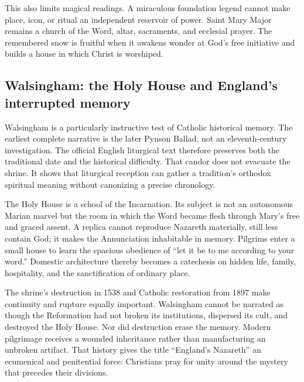 This also limits magical readings. A miraculous foundation legend cannot make place, icon, or ritual an independent reservoir of power. Saint Mary Major remains a church of the Word, altar, sacraments, and ecclesial prayer. The remembered snow is fruitful when it awakens wonder at God's free initiative and builds a house in which Christ is worshiped.

\subsection{Walsingham: the Holy House and England's interrupted memory}


Walsingham is a particularly instructive test of Catholic historical memory. The earliest complete narrative is the later Pynson Ballad, not an eleventh-century investigation. The official English liturgical text therefore preserves both the traditional date and the historical difficulty. That candor does not evacuate the shrine. It shows that liturgical reception can gather a tradition's orthodox spiritual meaning without canonizing a precise chronology.

The Holy House is a school of the Incarnation. Its subject is not an autonomous Marian marvel but the room in which the Word became flesh through Mary's free and graced assent. A replica cannot reproduce Nazareth materially, still less contain God; it makes the Annunciation inhabitable in memory. Pilgrims enter a small house to learn the spacious obedience of ``let it be to me according to your word.'' Domestic architecture thereby becomes a catechesis on hidden life, family, hospitality, and the sanctification of ordinary place.

The shrine's destruction in 1538 and Catholic restoration from 1897 make continuity and rupture equally important. Walsingham cannot be narrated as though the Reformation had not broken its institutions, dispersed its cult, and destroyed the Holy House. Nor did destruction erase the memory. Modern pilgrimage receives a wounded inheritance rather than manufacturing an unbroken artifact. That history gives the title ``England's Nazareth'' an ecumenical and penitential force: Christians pray for unity around the mystery that precedes their divisions.

